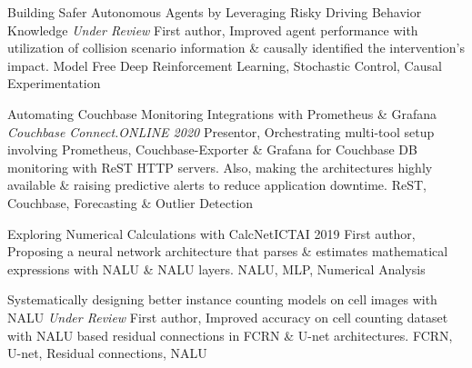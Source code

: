 
\begin{projects}
    
    \iffalse
    \project
	{Quantifying prognosis severity of COVID-19
patients from deep learning based analysis of CT
chest images}{ \textit{Under Review} }
    	{
	\website{}{Paper: Not Public}
	\website{}{Code: Not Public}
	}
	{First author, A severity estimator Single Shot Detector (SSD) network for better COVID-19 prognosis on medically appropriated annotated CT image slice dataset with PGIMER, Chandigarh researchers.}
	{SSD, Image Similarity Networks, Multiclass classification}
    \fi

	\project
	{Building Safer Autonomous Agents by Leveraging Risky Driving Behavior Knowledge}{ \textit{Under Review} }
	{
	}
	{First author, Improved agent performance with utilization of collision scenario information \& causally identified the intervention's impact.}
	{Model Free Deep Reinforcement Learning, Stochastic Control, Causal Experimentation}
    
	\project
	{Automating Couchbase Monitoring Integrations with Prometheus \& Grafana}{ \textit{Couchbase Connect.ONLINE 2020} }
	{
	}
	{Presentor, Orchestrating multi-tool setup involving Prometheus, Couchbase-Exporter \& Grafana for Couchbase DB monitoring with ReST HTTP servers. Also, making the architectures highly available \& raising predictive alerts to reduce application downtime.}
	{ReST, Couchbase, Forecasting \& Outlier Detection}
	
	
	\project
	{Exploring Numerical Calculations with CalcNet}{ICTAI 2019}
	{  }
	{First author, Proposing a neural network architecture that parses \& estimates mathematical expressions with NALU \& NALU layers.}
	{NALU, MLP, Numerical Analysis}
			
			
	\project
	{Systematically designing better instance counting models on cell images with NALU}{ \textit{Under Review} }
	{
	}
	{First author, Improved accuracy on cell counting dataset with NALU based residual connections in FCRN \& U-net architectures.}
	{FCRN, U-net, Residual connections, NALU}

	
\end{projects}